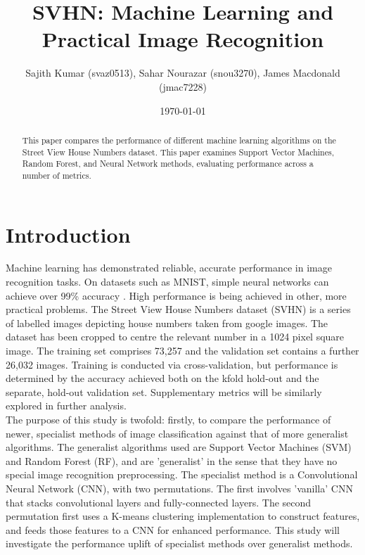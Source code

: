 \documentclass[11pt]{article}
\title{SVHN: Machine Learning and Practical Image Recognition}
\author{Sajith Kumar (svaz0513), Sahar Nourazar (snou3270), James Macdonald (jmac7228)}
\date{\today}
\begin{document}
\maketitle
\thispagestyle{empty}

\begin{abstract}
This paper compares the performance of different machine learning algorithms on the Street View House Numbers dataset. This paper examines Support Vector Machines, Random Forest, and Neural Network methods, evaluating performance across a number of metrics.
\end{abstract}

\section{Introduction}
 
Machine learning has demonstrated reliable, accurate performance in image recognition tasks. On datasets such as MNIST, simple neural networks can achieve over 99\% accuracy \citep{tfmnist}. High performance is being achieved in other, more practical problems. The Street View House Numbers dataset (SVHN) is a series of labelled images depicting house numbers taken from google images. The dataset has been cropped to centre the relevant number in a 1024 pixel square image. The training set comprises 73,257 and the validation set contains a further 26,032 images. Training is conducted via cross-validation, but performance is determined by the accuracy achieved both on the kfold hold-out and the separate, hold-out validation set. Supplementary metrics will be similarly explored in further analysis.\\

The purpose of this study is twofold: firstly, to compare the performance of newer, specialist methods of image classification against that of more generalist algorithms. The generalist algorithms used are Support Vector Machines (SVM) and Random Forest (RF), and are 'generalist' in the sense that they have no special image recognition preprocessing. The specialist method is a Convolutional Neural Network (CNN), with two permutations. The first involves 'vanilla' CNN that stacks convolutional layers and fully-connected layers. The second permutation first uses a K-means clustering implementation to construct features, and feeds those features to a CNN for enhanced performance. This study will investigate the performance uplift of specialist methods over generalist methods.\\
\end{document}
